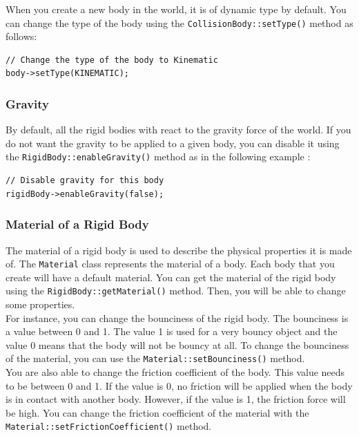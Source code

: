 \documentclass[a4paper,12pt]{article}
\begin{document}
    When you create a new body in the world, it is of dynamic type by default. You can change the type of the body using the \texttt{CollisionBody::setType()}
    method as follows:\\

    \begin{lstlisting}
// Change the type of the body to Kinematic
body->setType(KINEMATIC);
  \end{lstlisting}

    \subsubsection{Gravity}

    By default, all the rigid bodies with react to the gravity force of the world. If you do not want the gravity to be applied to a given body, you can disable
    it using the \texttt{RigidBody::enableGravity()} method as in the following example : \\

    \begin{lstlisting}
// Disable gravity for this body
rigidBody->enableGravity(false);
  \end{lstlisting}

    \subsubsection{Material of a Rigid Body}

    The material of a rigid body is used to describe the physical properties it is made of. The \texttt{Material} class represents the material of a body. Each body that
    you create will have a default material. You can get the material of the rigid body using the \texttt{RigidBody::getMaterial()} method. Then, you will be able to change some
    properties. \\

    For instance, you can change the bounciness of the rigid body. The bounciness is a value between 0 and 1. The value 1 is used for a very bouncy object and the value 0 means that
    the body will not be bouncy at all. To change the bounciness of the material, you can use the \texttt{Material::setBounciness()} method. \\

    You are also able to change the friction coefficient of the body. This value needs to be between 0 and 1. If the value is 0, no friction will be applied when the body is in contact with
    another body. However, if the value is 1, the friction force will be high. You can change the friction coefficient of the material with the
    \texttt{Material::setFrictionCoefficient()} method. \\
\end{document}
